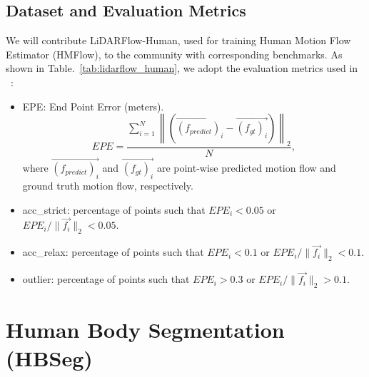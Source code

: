 \begin{appendix}

\subsection{Dataset and Evaluation Metrics}
We will contribute LiDARFlow-Human, used for training Human Motion Flow Estimator (HMFlow), to the community with corresponding benchmarks. As shown in Table.~\ref{tab:lidarflow_human}, we adopt the evaluation metrics used in ~\cite{puy2020flot,gu2019hplflownet,liu2019flownet3d,wu2019pointpwc}:
\begin{itemize}
\item EPE: End Point Error (meters). $$EPE = \frac{\sum_{i=1}^N \left\| (\vec{(f_{predict})_i}-\vec{(f_{gt})_i}) \right\|_2}{N},$$ where $\vec{(f_{predict})_i}$ and $\vec{(f_{gt})_i}$ are point-wise predicted motion flow and ground truth motion flow, respectively.

\item acc\_strict: percentage of points such that $EPE_i<0.05$ or $EPE_i/ \|\vec{f_i}\|_2<0.05$.
\item acc\_relax: percentage of points such that $EPE_i<0.1$ or $EPE_i/ \|\vec{f_i}\|_2<0.1$.
\item outlier: percentage of points such that $EPE_i>0.3$ or $EPE_i/ \|\vec{f_i}\|_2>0.1$.
\end{itemize}

\section{Human Body Segmentation (HBSeg)}


\end{appendix}
